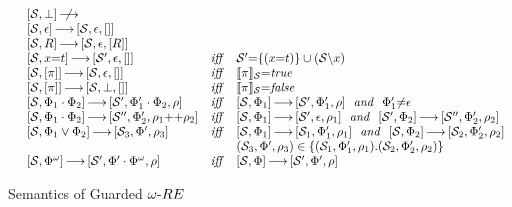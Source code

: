 \documentclass[acmsmall,screen,review,anonymous,nonacm]{acmart}
\begin{document}
\begin{figure*}[!h]%
{
\centering
\renewcommand{\arraystretch}{1.05}
$\begin{array}{lllll}
&[{\mathcal{S}}, {\bot}] \,{\centernot\longrightarrow}\ && \\
&\wreSemanticsmodel{\mathcal{S}}{\epsilon}{\mathcal{S}}{\epsilon}{[]} && \\
&\wreSemanticsmodel{\mathcal{S}}{\relation}{\mathcal{S}}{\epsilon}{[\relation]}  & & \\
&\wreSemanticsmodel{\mathcal{S}}{x{=}t}{\mathcal{S}^\prime}{\epsilon}{[]}  &\m{iff}& \mathcal{S}^\prime{=} 
\s{(x{=}t)} \cup (\mathcal{S}\text{\textbackslash} x)
\\
&\wreSemanticsmodel{\mathcal{S}}{[\pi]}{\mathcal{S}}{\epsilon}{[]}  &\m{iff}& \llbracket \pi\rrbracket_\mathcal{S} {=}\m{true} \\
&\wreSemanticsmodel{\mathcal{S}}{[\pi]}{\mathcal{S}}{\bot}{[]}  &\m{iff}& \llbracket \pi\rrbracket_\mathcal{S} {=}\m{false} \\
&\wreSemanticsmodel{\mathcal{S}}{\effect_1\cdot\effect_2}{\mathcal{S}^\prime}{\effect_1^\prime\cdot\effect_2}{\rho}  &\m{iff}&  
\wreSemanticsmodel{\mathcal{S}}{\effect_1}{\mathcal{S}^\prime}{\effect_1^\prime}{\rho}
\ \ \m{and} \ \  
\effect_1^\prime {\not=}\epsilon
\\
&\wreSemanticsmodel{\mathcal{S}}{\effect_1\cdot\effect_2}{\mathcal{S}^{\prime\prime}}{\effect_2^{\prime}}{\rho_1 {+}{+} \rho_2}  &\m{iff}&  
\wreSemanticsmodel{\mathcal{S}}{\effect_1}{\mathcal{S}^\prime}{\epsilon}{\rho_1}
\ \ \m{and} \ \  
\wreSemanticsmodel{\mathcal{S}^\prime}{\effect_2}{\mathcal{S}^{\prime\prime}}{\effect_2^\prime}{\rho_2}
\\
&\wreSemanticsmodel{\mathcal{S}}{\effect_1\vee\effect_2}{\mathcal{S}_3}{\effect^\prime}{\rho_3}  &\m{iff}&  
\wreSemanticsmodel{\mathcal{S}}{\effect_1}{\mathcal{S}_1}{\effect_1^\prime}{\rho_1}
\ \ \m{and} \ \  
\wreSemanticsmodel{\mathcal{S}}{\effect_2}{\mathcal{S}_2}{\effect_2^\prime}{\rho_2}
\\
&&&
(\mathcal{S}_3, \effect^\prime, \rho_3) \in \s{(\mathcal{S}_1, \effect_1^\prime, \rho_1). (\mathcal{S}_2, \effect_2^\prime, \rho_2)}
\\
&\wreSemanticsmodel{\mathcal{S}}{\effect^\omega}{\mathcal{S}^\prime}{\effect^\prime \cdot \effect^\omega}{\rho}  &\m{iff}&   
\wreSemanticsmodel{\mathcal{S}}{\effect}{\mathcal{S}^\prime}{\effect^\prime}{\rho}
\end{array}$
\caption{Semantics of Guarded ${\omega\text{-}RE}$}
\label{fig:emantics_of_Omega_RE}
}
\end{figure*}
\end{document}
